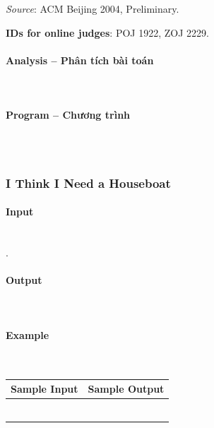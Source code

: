 \documentclass{article}
\begin{document}
\textit{Source}: ACM Beijing 2004, Preliminary.

\textbf{IDs for online judges}: POJ 1922, ZOJ 2229.


\paragraph{Analysis -- Phân tích bài toán} \mbox{} \\


\paragraph{Program -- Chương trình} \mbox{} \\


\begin{lstlisting}

\end{lstlisting}


\subsubsection{I Think I Need a Houseboat}


\paragraph{Input} \mbox{} \\

.

\paragraph{Output}\mbox{} \\



\paragraph{Example}\mbox{} \\

\begin{table}[h]
    \centering
    \begin{tabular}{|l|r|}
        \hline
        \textbf{Sample Input} & \textbf{Sample Output} \\
        \hline
            &   \\ 
            &  \\ 
            &  \\ 
            &  \\ 
            &  \\ 
            &  \\ \hline
    \end{tabular}
\end{table}
\end{document}
